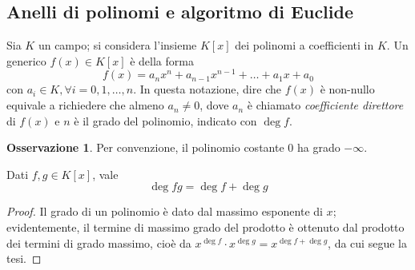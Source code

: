 \documentclass[11pt, a4paper]{scrartcl}
\theoremstyle{definition}
\numberwithin{esempio}{section}
\theoremstyle{definition}
\newtheorem{obs}{Osservazione}
\numberwithin{obs}{section}
\numberwithin{nota}{section}
\numberwithin{equation}{subsection}
\begin{document}
\subsection{Anelli di polinomi e algoritmo di Euclide}
Sia $K$ un campo; si considera l'insieme $K[x]$ dei polinomi a coefficienti in $K$.
Un generico $f(x) \in K[x]$ \`e della forma
\[
f(x) = a_n x^n + a_{n-1} x^{n-1} +\ldots+ a_1 x + a_0
\] 
con $a_i \in K, \forall i = 0,1,\ldots,n$.
In questa notazione, dire che $f(x)$ \`e non-nullo equivale a richiedere che almeno $a_n \neq 0$, dove $a_n$ \`e chiamato \textit{coefficiente direttore} di $f(x)$ e $n$ \`e il grado del polinomio, indicato con $\operatorname{deg} f$.

\begin{obs}
	Per convenzione, il polinomio costante $0$ ha grado $-\infty$.
\end{obs}
\begin{prop}
	{}{}
	Dati $f,g \in K[x]$, vale
	\[
	\operatorname{deg} fg = \operatorname{deg} f + \operatorname{deg} g
	\] 
	\begin{proof}
		Il grado di un polinomio \`e dato dal massimo esponente di $x$; evidentemente, il termine di massimo grado del prodotto \`e ottenuto dal prodotto dei termini di grado massimo, cio\`e da $x^{\operatorname{deg} f} \cdot x ^{\operatorname{deg} g} = x^{\operatorname{deg} f + \operatorname{deg} g} $, da cui segue la tesi.
	\end{proof}
\end{prop}
\end{document}
